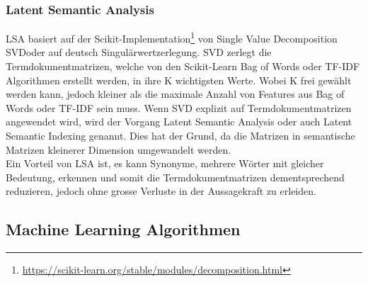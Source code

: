 \subsubsection{Latent Semantic Analysis}
LSA basiert auf der Scikit-Implementation\footnote{\url{https://scikit-learn.org/stable/modules/decomposition.html}} von \glqq Single Value Decomposition SVD\grqq{}oder auf deutsch \glqq Singulärwertzerlegung\grqq{}.
SVD zerlegt die Termdokumentmatrizen, welche von den Scikit-Learn Bag of Words oder TF-IDF Algorithmen erstellt werden, in ihre K wichtigsten Werte. Wobei K frei gewählt werden kann, jedoch kleiner als die maximale Anzahl von Features aus Bag of Words oder TF-IDF sein muss.
Wenn SVD explizit auf Termdokumentmatrizen angewendet wird, wird der Vorgang \glqq Latent Semantic Analysis\grqq{} oder auch \glqq Latent Semantic Indexing\grqq{} genannt.
Dies hat der Grund, da die Matrizen in semantische Matrizen kleinerer Dimension umgewandelt werden.\\
Ein Vorteil von LSA ist, es kann Synonyme, mehrere Wörter mit gleicher Bedeutung, erkennen und somit die Termdokumentmatrizen dementsprechend reduzieren, jedoch ohne grosse Verluste in der Aussagekraft zu erleiden.
\subsection{Machine Learning Algorithmen}

